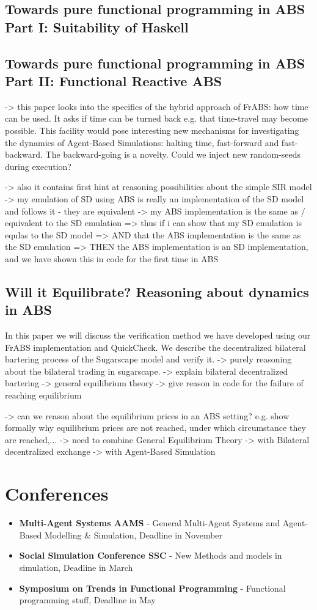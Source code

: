 \subsection{Towards pure functional programming in ABS Part I: Suitability of Haskell}

\subsection{Towards pure functional programming in ABS Part II: Functional Reactive ABS}
-> this paper looks into the specifics of the hybrid approach of FrABS: how time can be used. It asks if time can be turned back e.g. that time-travel may become possible. This facility would pose interesting new mechanisms for investigating the dynamics of Agent-Based Simulations: halting time, fast-forward and fast-backward. The backward-going is a novelty. Could we inject new random-seeds during execution? 

-> also it contains first hint at reasoning possibilities about the simple SIR model
		-> my emulation of SD using ABS is really an implementation of the SD model and follows it - they are equivalent
		-> my ABS implementation is the same as / equivalent to the SD emulation
			=> thus if i can show that my SD emulation is equlas to the SD model
			=> AND that the ABS implementation is the same as the SD emulation
			=> THEN the ABS implementation is an SD implementation, and we have shown this in code for the first time in ABS

\subsection{Will it Equilibrate? Reasoning about dynamics in ABS}
In this paper we will discuss the verification method we have developed using our FrABS implementation and QuickCheck. We describe the decentralized bilateral bartering process of the Sugarscape model and verify it.
-> purely reasoning about the bilateral trading in sugarscape.
	-> explain bilateral decentralized bartering
	-> general equilibrium theory
	-> give reason in code for the failure of reaching equilibrium

-> can we reason about the equilibrium prices in an ABS setting? e.g. show formally why equilibrium prices are not reached, under which circumstance they are reached,...
			-> need to combine General Equilibrium Theory
			-> with Bilateral decentralized exchange
			-> with Agent-Based Simulation 
			
\section{Conferences}
\begin{itemize}
	\item \textbf{Multi-Agent Systems AAMS} - General Multi-Agent Systems and Agent-Based Modelling \& Simulation, Deadline in November
	\item \textbf{Social Simulation Conference SSC} - New Methods and models in simulation, Deadline in March
	\item \textbf{Symposium on Trends in Functional Programming} - Functional programming stuff, Deadline in May
\end{itemize}

